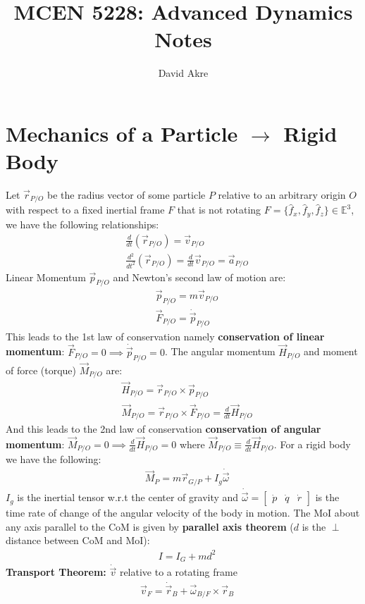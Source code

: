 \documentclass[conference]{IEEEtran}
\begin{document}
\title{MCEN 5228: Advanced Dynamics Notes}

\author{David Akre}

\section{Mechanics of a Particle $\to$ Rigid Body}
Let $\vec{r}_{P/O}$ be the radius vector of some particle $P$ relative to an arbitrary origin $O$ with respect to a fixed inertial frame $F$ that is not rotating $F = \{\hat{f}_x, \hat{f}_y, \hat{f}_z\} \in \mathbb{E}^3$, we have the following relationships:
\begin{align}
    & \frac{d}{dt}(\vec{r}_{P/O}) = \vec{v}_{P/O} \\
    & \frac{d^2}{dt^2}(\vec{r}_{P/O}) = \frac{d}{dt}{\vec{v}_{P/O}} = \vec{a}_{P/O}
\end{align}
Linear Momentum $\vec{p}_{P/O}$ and Newton's second law of motion are:
\begin{align}
    & \vec{p}_{P/O} = m \vec{v}_{P/O} \\
    & \vec{F}_{P/O} = \dot{\vec{p}}_{P/O}
\end{align}
This leads to the 1st law of conservation namely \textbf{conservation of linear momentum}: $\vec{F}_{P/O} = 0 \implies \dot{\vec{p}}_{P/O} = 0$. The angular momentum $\vec{H}_{P/O}$ and moment of force (torque) $\vec{M}_{P/O}$ are:
\begin{align}
    & \vec{H}_{P/O} = \vec{r}_{P/O} \times \vec{p}_{P/O} \\
    & \vec{M}_{P/O} = \vec{r}_{P/O} \times \vec{F}_{P/O} = \frac{d}{dt}\vec{H}_{P/O}
\end{align}
And this leads to the 2nd law of conservation \textbf{conservation of angular momentum}: $\vec{M}_{P/O} = 0 \implies \frac{d}{dt}\vec{H}_{P/O} = 0$ where $\vec{M}_{P/O} \equiv \frac{d}{dt}\vec{H}_{P/O}$. For a rigid body we have the following:
\begin{align}
    & \vec{M}_P = m \vec{r}_{G/P} + I_g \dot{\vec{\omega}}
\end{align}
$I_g$ is the inertial tensor w.r.t the center of gravity and $\dot{\vec{\omega}} = \begin{bmatrix} \dot{p} & \dot{q} & \dot{r} \end{bmatrix}$ is the time rate of change of the angular velocity of the body in motion. The MoI about any axis parallel to the CoM is given by \textbf{parallel axis theorem} ($d$ is the $\perp$ distance between CoM and MoI):
\begin{align}
    & I = I_G + m d^2
\end{align}
\textbf{Transport Theorem:} $\dot{\vec{v}}$ relative to a rotating frame
    \begin{align}
        & \vec{v}_F = \dot{\vec{r}}_B + \vec{\omega}_{B/F} \times \vec{r}_B
    \end{align}
\end{document}
